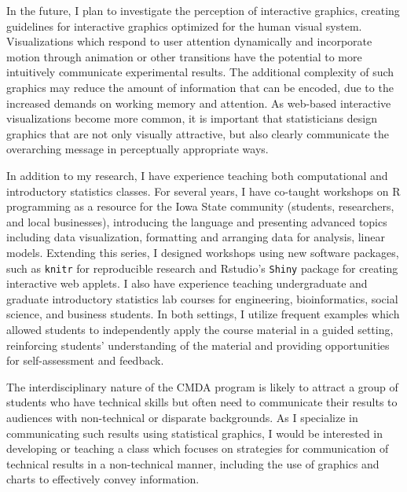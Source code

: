 \documentclass[11pt,letterpaper,sans,unicode]{moderncv}        %
\begin{document}
In the future, I plan to investigate the perception of interactive graphics, creating guidelines for interactive graphics optimized for the human visual system. Visualizations which respond to user attention dynamically and incorporate motion through animation or other transitions have the potential to more intuitively communicate experimental results. The additional complexity of such graphics may reduce the amount of information that can be encoded, due to the increased demands on working memory and attention. As web-based interactive visualizations become more common, it is important that statisticians design graphics that are not only visually attractive, but also clearly communicate the overarching message in perceptually appropriate ways.


In addition to my research, I have experience teaching both computational and introductory statistics classes. For several years, I have co-taught workshops on R programming as a resource for the Iowa State community (students, researchers, and local businesses), introducing the language and presenting advanced topics including data visualization, formatting and arranging data for analysis, linear models. Extending this series, I designed workshops using new software packages, such as \texttt{knitr} for reproducible research and Rstudio's \texttt{Shiny} package for creating interactive web applets. I also have experience teaching undergraduate and graduate introductory statistics lab courses for engineering, bioinformatics, social science, and business students. In both settings, I utilize frequent examples which allowed students to independently apply the course material in a guided setting, reinforcing students' understanding of the material and providing opportunities for self-assessment and feedback. 

The interdisciplinary nature of the CMDA program is likely to attract a group of students who have technical skills but often need to communicate their results to audiences with non-technical or disparate backgrounds. As I specialize in communicating such results using statistical graphics, I would be interested in developing or teaching a class which focuses on strategies for communication of technical results in a non-technical manner, including the use of graphics and charts to effectively convey information. 
\end{document}

